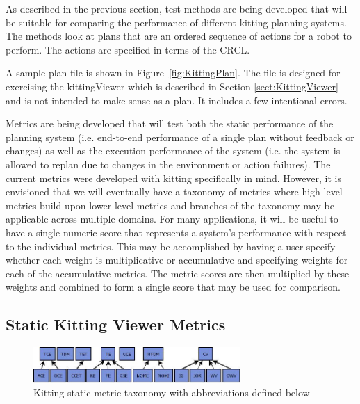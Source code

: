 As described in the previous section, test methods are being developed that
will be suitable for comparing the performance of different kitting
planning systems. The methods look at plans that are an ordered sequence
of actions for a robot to perform. The actions are specified in terms of
the CRCL.

A sample plan file is shown in Figure~\ref{fig:KittingPlan}. The file is
designed for exercising the kittingViewer which is described in Section \ref{sect:KittingViewer}
and is not intended to make sense
as a plan. It includes a few intentional errors.

Metrics are being developed that will test both the static performance of the planning system
(i.e. end-to-end performance of a single plan without feedback or changes) as well as the
execution performance of the system (i.e. the system is allowed to replan due to changes
in the environment or action failures). The current metrics were developed with
kitting specifically in mind. However, it is envisioned that we will eventually have
a taxonomy of metrics where high-level metrics build upon lower level metrics and
branches of the taxonomy may be applicable across multiple domains. For many
applications, it will be useful to have a single numeric score that represents a system\rq{}s
performance with respect to the individual metrics. This may be accomplished by having a
user specify whether each weight is multiplicative or accumulative and specifying
weights for each of the accumulative metrics. The metric scores are then multiplied by
these weights and combined to form a single score that may be used for comparison.

\subsection{Static Kitting Viewer Metrics}
\begin{figure}[ht!]
		\begin{center}
			\includegraphics[width=3.1in]{images/MetricTaxonomy.jpg}
		\end{center}

	\caption{Kitting static metric taxonomy with abbreviations defined below}
	\label{fig:StaticMetricTax}
\end{figure}

